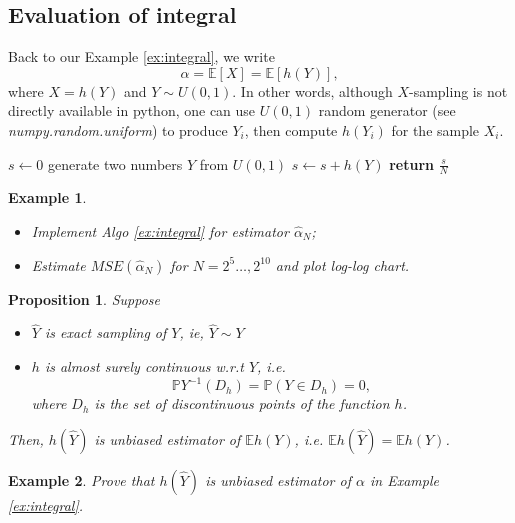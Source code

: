 \documentclass{article}
\newtheorem{proposition}[theorem]{Proposition}
\newtheorem{example}{Example}
\begin{document}
\subsection{Evaluation of integral}
Back to our Example \ref{ex:integral}, we write
$$\alpha = \mathbb E[X] = \mathbb E[h(Y)],$$
where $X = h(Y)$ and $Y\sim U(0,1)$.
In other words, although $X$-sampling is not directly available in python, 
one can use $U(0,1)$ random generator (see {\it numpy.random.uniform}) to produce $Y_i$, then compute $h(Y_i)$ for 
the sample $X_i$.


\begin{algorithm}
\caption{Integral by MC - Example \ref{ex:integral}}
\label{alg:mcpi}
\begin{algorithmic}[1]
\State  $s \gets 0$ 
	\State generate two numbers $Y$ from $U(0,1)$ 
	\State $s\gets s+h(Y)$ 
\EndFor
\State \textbf{return} $\frac{s}{N}$ 
\EndProcedure
\end{algorithmic}
\end{algorithm}

\begin{example}
\begin{itemize}
 \item Implement Algo \ref{ex:integral} for estimator $\hat \alpha_{N}$;
 \item Estimate $MSE(\hat \alpha_{N})$ for $N= 2^{5} \ldots, 2^{10}$ and plot log-log chart.

\end{itemize}
 \end{example}

\begin{proposition}
 \label{ex:conv1}
 Suppose 
\begin{itemize}
 \item  $\hat Y$ is exact sampling of $Y$, ie, $\hat Y \sim Y$ 
 \item $h$ is almost surely continuous w.r.t $Y$, i.e. $$\mathbb P Y^{-1} (D_{h}) = \mathbb P(Y\in D_{h}) = 0,$$
 where $D_{h}$ is the set of discontinuous points of the function $h$.
\end{itemize}
Then, $h(\hat Y) $ is unbiased estimator of $\mathbb Eh(Y)$, i.e. 
$\mathbb E h(\hat Y) = \mathbb E h(Y)$.
\end{proposition}

\begin{example}
 Prove that $h(\hat Y)$ is unbiased estimator of $\alpha$ in Example \ref{ex:integral}.
\end{example}
\end{document}
